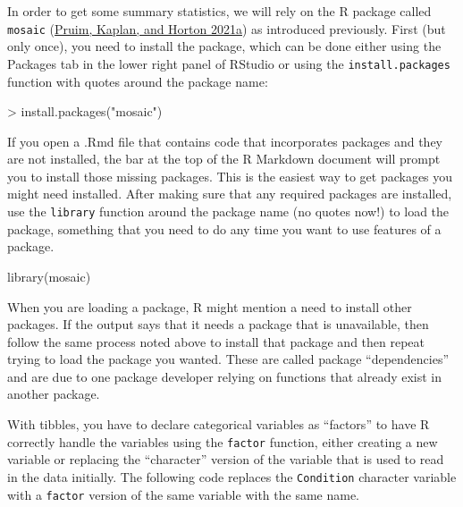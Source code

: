 \documentclass[
]{book}
\newenvironment{Shaded}{\begin{snugshade}}{\end{snugshade}}
\newcommand{\FunctionTok}[1]{\textcolor[rgb]{0.00,0.00,0.00}{#1}}
\newcommand{\NormalTok}[1]{#1}
\newcommand{\SpecialCharTok}[1]{\textcolor[rgb]{0.00,0.00,0.00}{#1}}
\newcommand{\StringTok}[1]{\textcolor[rgb]{0.31,0.60,0.02}{#1}}
\begin{document}
\newpage

\indent In order to get some summary statistics, we will rely on the R package called
\texttt{mosaic} (\protect\hyperlink{ref-R-mosaic}{Pruim, Kaplan, and Horton 2021a}) as introduced previously. First (but only once),
you need to install the package, which can
be done either using the Packages tab in the lower right panel of RStudio or
using the \texttt{install.packages} function with quotes around the package name:

\begin{Shaded}
\begin{Highlighting}[]
\SpecialCharTok{\textgreater{}} \FunctionTok{install.packages}\NormalTok{(}\StringTok{"mosaic"}\NormalTok{)}
\end{Highlighting}
\end{Shaded}

If you open a .Rmd file that contains code that incorporates packages and they are not installed, the bar at the top of the R Markdown document will prompt you to install those missing packages. This is the easiest way to get packages you might need installed. After making sure that any required packages are installed, use the \texttt{library}
function around the package name (no quotes now!) to load the package, something that
you need to do any time you want to use features of a package.

\begin{Shaded}
\begin{Highlighting}[]
\FunctionTok{library}\NormalTok{(mosaic)}
\end{Highlighting}
\end{Shaded}

When you are loading a package, R might mention a need to install other packages. If the output says that it needs a package that is
unavailable, then follow the same process noted above to install that package
and then repeat trying to load the package you wanted. These are called package ``dependencies'' and are due to one package developer relying on functions that already exist in another package.

\indent With tibbles, you have to declare categorical variables as ``factors''  to have R correctly handle the variables using the \texttt{factor} function, either creating a new variable or replacing the ``character'' version of the variable that is used to read in the data initially. The following code replaces the \texttt{Condition} character variable with a \texttt{factor} version of the same variable with the same name.
\end{document}
